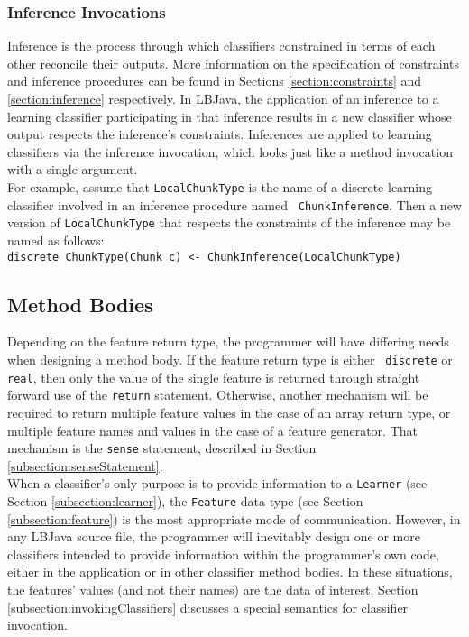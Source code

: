 \subsubsection{Inference Invocations}
\label{subsubsection:inferenceInvocations}
Inference is the process through which classifiers constrained in terms of
each other reconcile their outputs.  More information on the specification of
constraints and inference procedures can be found in Sections
\ref{section:constraints} and \ref{section:inference} respectively.  In LBJava,
the application of an inference to a learning classifier participating in that
inference results in a new classifier whose output respects the inference's
constraints.  Inferences are applied to learning classifiers via the inference
invocation, which looks just like a method invocation with a single argument.
\\

For example, assume that {\tt LocalChunkType} is the name of a discrete
learning classifier involved in an inference procedure named {\tt
ChunkInference}.  Then a new version of {\tt LocalChunkType} that respects the
constraints of the inference may be named as follows: \\

\vspace{-.25cm}
{\tt discrete ChunkType(Chunk c) <- ChunkInference(LocalChunkType)}

\subsection{Method Bodies} \label{section:methodBodies}

Depending on the feature return type, the programmer will have differing needs
when designing a method body.  If the feature return type is either {\tt
discrete} or {\tt real}, then only the value of the single feature is returned
through straight forward use of the {\tt return} statement.  Otherwise,
another mechanism will be required to return multiple feature values in the
case of an array return type, or multiple feature names and values in the case
of a feature generator.  That mechanism is the {\tt sense} statement,
described in Section \ref{subsection:senseStatement}. \\

When a classifier's only purpose is to provide information to a {\tt Learner}
(see Section \ref{subsection:learner}), the {\tt Feature} data type (see
Section \ref{subsection:feature}) is the most appropriate mode of
communication.  However, in any LBJava source file, the programmer will
inevitably design one or more classifiers intended to provide information
within the programmer's own code, either in the application or in other
classifier method bodies.  In these situations, the features' values (and not
their names) are the data of interest.  Section
\ref{subsection:invokingClassifiers} discusses a special semantics for
classifier invocation.

